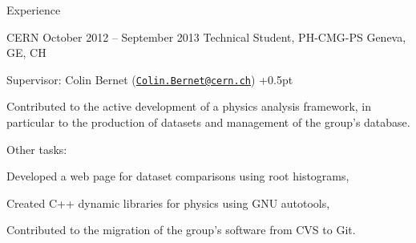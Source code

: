 \documentclass{resume}
\begin{document}
\begin{rSection}{Experience}

\begin{rSubsection}
  {CERN}
  {October 2012 -- September 2013}
  {Technical Student, PH-CMG-PS}
  {Geneva, GE, CH}
\item Supervisor: Colin Bernet
  (\href{mailto:Colin.Bernet@cern.ch}{\nolinkurl{Colin.Bernet@cern.ch}})
  \itemsep +0.5pt %
\item Contributed to the active development of a physics analysis framework,
  in particular to the production of datasets and management of the
  group's database.
\item Other tasks: \\
  \begin{inparaenum}[(i)]
  \item Developed a web page for dataset comparisons using root histograms, \\
  \item Created C++ dynamic libraries for physics using GNU autotools, \\
  \item Contributed to the migration of the group's software from CVS to Git.
  \end{inparaenum}
\end{rSubsection}




\end{rSection}
\end{document}
